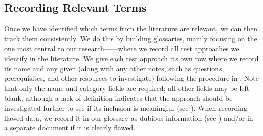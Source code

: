 
\subsection{Recording Relevant Terms}\label{record-terms}

\ifnotpaper
    
\fi

Once we have identified which terms from the literature are relevant, we can
then track them consistently. We do this by building glossaries, mainly
focusing on the one most central to our research---\ourApproachGlossary{}---where
we record all test approaches we identify in the literature. We give each test
approach its own row where we record its name and any given \approachFields*{}
(along with any other notes, such as questions, prerequisites, and other
resources to investigate) following the procedure in .
Note that only the name and category fields are required; all other fields
may be left blank, although a lack of definition indicates that the approach
should be investigated further to see if its inclusion is meaningful (see
). When recording flawed data, we record it in our glossary as
dubious information (see )
and/or in a separate document if it is clearly flawed.

